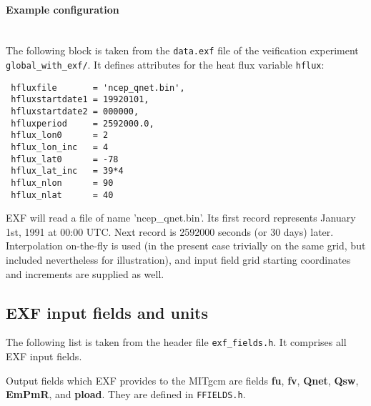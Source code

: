 \paragraph{Example configuration} ~ \\
%
The following block is taken from the \texttt{data.exf} file
of the veification experiment \texttt{global\_with\_exf/}.
It defines attributes for the heat flux variable \texttt{hflux}:

\begin{verbatim}
 hfluxfile       = 'ncep_qnet.bin',
 hfluxstartdate1 = 19920101,
 hfluxstartdate2 = 000000,
 hfluxperiod     = 2592000.0,
 hflux_lon0      = 2
 hflux_lon_inc   = 4
 hflux_lat0      = -78
 hflux_lat_inc   = 39*4
 hflux_nlon      = 90
 hflux_nlat      = 40
\end{verbatim}

EXF will read a file of name 'ncep\_qnet.bin'.
Its first record represents January 1st, 1991 at 00:00 UTC.
Next record is 2592000 seconds (or 30 days) later.
Interpolation on-the-fly is used (in the present case trivially
on the same grid, but included nevertheless for illustration), 
and input field grid starting coordinates and increments are 
supplied as well.


\subsection{EXF input fields and units
\label{sec:pkg:exf:fields_units}}

The following list is taken from the header file \texttt{exf\_fields.h}.
It comprises all EXF input fields.

Output fields which EXF provides to the MITgcm are fields
\textbf{fu}, \textbf{fv}, \textbf{Qnet}, \textbf{Qsw}, \textbf{EmPmR},
and \textbf{pload}. They are defined in \texttt{FFIELDS.h}.

